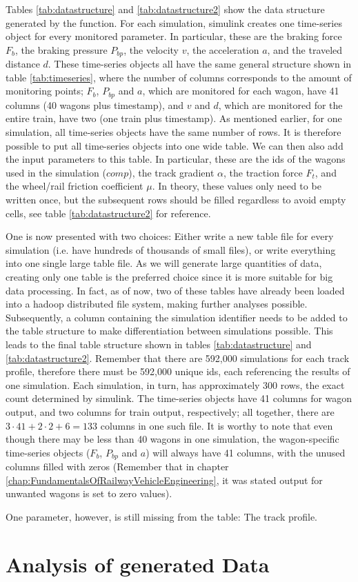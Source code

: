 \par\noindent
Tables \ref{tab:datastructure} and \ref{tab:datastructure2} show the data structure generated by the  function. For each simulation, simulink creates one time-series object for every monitored parameter. In particular, these are the braking force $F_{b}$, the braking pressure $P_{bp}$, the velocity $v$, the acceleration $a$, and the traveled distance $d$. These time-series objects all have the same general structure shown in table \ref{tab:timeseries}, where the number of columns corresponds to the amount of monitoring points; $F_{b}$, $P_{bp}$ and $a$, which are monitored for each wagon, have 41 columns (40 wagons plus timestamp), and $v$ and $d$, which are monitored for the entire train, have two (one train plus timestamp). As mentioned earlier, for one simulation, all time-series objects have the same number of rows. It is therefore possible to put all time-series objects into one wide table. We can then also add the input parameters to this table. In particular, these are the ids of the wagons used in the simulation ($comp$), the track gradient $\alpha$, the traction force $F_{t}$, and the wheel/rail friction coefficient $\mu$. In theory, these values only need to be written once, but the subsequent rows should be filled regardless to avoid empty cells, see table \ref{tab:datastructure2} for reference. 
\par
One is now presented with two choices: Either write a new table file for every simulation (i.e. have hundreds of thousands of small files), or write everything into one single large table file. As we will generate large quantities of data, creating only one table is the preferred choice since it is more suitable for big data processing. In fact, as of now, two of these tables have already been loaded into a hadoop distributed file system, making further analyses possible. Subsequently, a column containing the simulation identifier needs to be added to the table structure to make differentiation between simulations possible. This leads to the final table structure shown in tables \ref{tab:datastructure} and \ref{tab:datastructure2}. Remember that there are 592,000 simulations for each track profile, therefore there must be 592,000 unique ids, each referencing the results of one simulation. Each simulation, in turn, has approximately 300 rows, the exact count determined by simulink. The time-series objects have 41 columns for wagon output, and two columns for train output, respectively; all together, there are $3 \cdot 41 + 2 \cdot 2 + 6 = 133$ columns in one such file. It is worthy to note that even though there may be less than 40 wagons in one simulation, the wagon-specific time-series objects ($F_{b}$, $P_{bp}$ and $a$) will always have 41 columns, with the unused columns filled with zeros (Remember that in chapter \ref{chap:FundamentalsOfRailwayVehicleEngineering}, it was stated output for unwanted wagons is set to zero values).
\par
One parameter, however, is still missing from the table: The track profile. 

\section{Analysis of generated Data}
\label{sec:AnalysisOfGeneratedData}